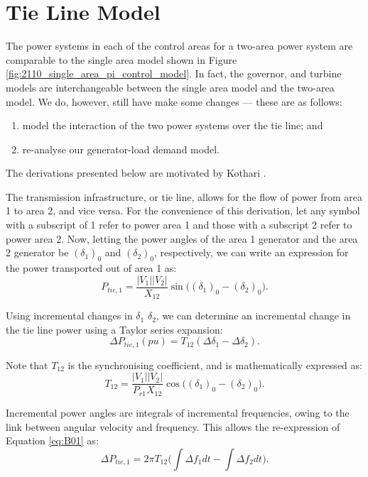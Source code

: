 \section{Tie Line Model}\label{fig:tie_line_model}
The power systems in each of the control areas for a two-area power system are comparable to the single area model shown in Figure \ref{fig:2110_single_area_pi_control_model}. In fact, the governor, and turbine models are interchangeable between the single area model and the two-area model. We do, however, still have make some changes --- these are as follows:
\begin{enumerate}
	\item model the interaction of the two power systems over the tie line; and
	\item re-analyse our generator-load demand model.
\end{enumerate}

The derivations presented below are motivated by Kothari \cite{Kothari2011}.

The transmission infrastructure, or tie line, allows for the flow of power from area 1 to area 2, and vice versa. For the convenience of this derivation, let any symbol with a subscript of 1 refer to power area 1 and those with a subscript 2 refer to power area 2. Now, letting the power angles of the area 1 generator and the area 2 generator be $(\delta_1)_0$ and $(\delta_2)_0$, respectively, we can write an expression for the power transported out of area 1 as:
\begin{equation}
	P_{tie, 1} = \frac{|V_1||V_2|}{X_{12}} \sin \big( (\delta_1)_0 - (\delta_2)_0 \big).
\end{equation}

Using incremental changes in $\delta_1$ $\delta_2$, we can determine an incremental change in the tie line power using a Taylor series expansion:
\begin{equation}
	\Delta P_{tie, 1}(pu) = T_{12} (\Delta \delta_1 - \Delta \delta_2). \label{eq:B01}
\end{equation}

Note that $T_{12}$ is the synchronising coefficient, and is mathematically expressed as:
\begin{equation}
	T_{12} = \frac{|V_1||V_2|}{P_{r1} X_{12}} \cos \big( (\delta_1)_0 - (\delta_2)_0 \big).
\end{equation}

Incremental power angles are integrals of incremental frequencies, owing to the link between  angular velocity and frequency. This allows the re-expression of Equation \ref{eq:B01} as:
\begin{equation}
	\Delta P_{tie, 1} = 2 \pi T_{12} \bigg( \int \Delta f_1 dt - \int \Delta f_2 dt \bigg). \label{eq:B02}
\end{equation}

